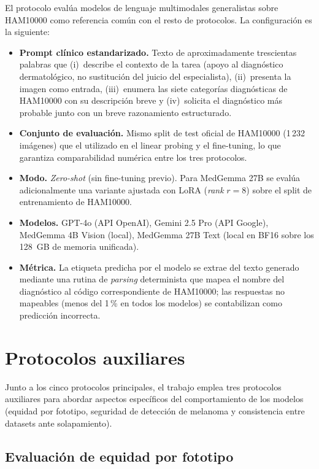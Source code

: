 El protocolo evalúa modelos de lenguaje multimodales generalistas
sobre HAM10000 como referencia común con el resto de protocolos.
La configuración es la siguiente:

\begin{itemize}
\item \textbf{Prompt clínico estandarizado.} Texto de
aproximadamente trescientas palabras que (i)~describe el contexto
de la tarea (apoyo al diagnóstico dermatológico, no sustitución
del juicio del especialista), (ii)~presenta la imagen como
entrada, (iii)~enumera las siete categorías diagnósticas de
HAM10000 con su descripción breve y (iv)~solicita el diagnóstico
más probable junto con un breve razonamiento estructurado.
\item \textbf{Conjunto de evaluación.} Mismo split de test
oficial de HAM10000 (1\,232 imágenes) que el utilizado en el
linear probing y el fine-tuning, lo que garantiza comparabilidad
numérica entre los tres protocolos.
\item \textbf{Modo.} \emph{Zero-shot} (sin fine-tuning previo).
Para MedGemma 27B se evalúa adicionalmente una variante ajustada
con LoRA (\emph{rank} $r=8$) sobre el split de entrenamiento de
HAM10000.
\item \textbf{Modelos.} GPT-4o (API OpenAI), Gemini 2.5 Pro (API
Google), MedGemma 4B Vision (local), MedGemma 27B Text (local en
BF16 sobre los 128~GB de memoria unificada).
\item \textbf{Métrica.} La etiqueta predicha por el modelo se
extrae del texto generado mediante una rutina de \emph{parsing}
determinista que mapea el nombre del diagnóstico al código
correspondiente de HAM10000; las respuestas no mapeables (menos
del 1\,\% en todos los modelos) se contabilizan como predicción
incorrecta.
\end{itemize}

\section{Protocolos auxiliares}
\label{sec:protocolos-auxiliares}

Junto a los cinco protocolos principales, el trabajo emplea tres
protocolos auxiliares para abordar aspectos específicos del
comportamiento de los modelos (equidad por fototipo, seguridad de
detección de melanoma y consistencia entre datasets ante
solapamiento).

\subsection{Evaluación de equidad por fototipo}
\label{sec:equidad-protocol}

